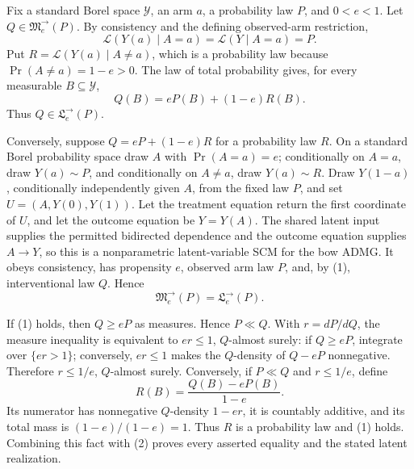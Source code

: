 Fix a standard Borel space \(\mathcal Y\), an arm \(a\), a probability law \(P\), and \(0<e<1\).  Let \(Q\in\mathfrak M^{\to}_e(P)\).  By consistency and the defining observed-arm restriction,
\[
 \mathcal L(Y(a)\mid A=a)=\mathcal L(Y\mid A=a)=P.
\]
Put \(R=\mathcal L(Y(a)\mid A\ne a)\), which is a probability law because \(\Pr(A\ne a)=1-e>0\).  The law of total probability gives, for every measurable \(B\subseteq\mathcal Y\),
\[
 Q(B)=eP(B)+(1-e)R(B). \tag{1}
\]
Thus \(Q\in\mathfrak L^{\to}_e(P)\).

Conversely, suppose \(Q=eP+(1-e)R\) for a probability law \(R\).  On a standard Borel probability space draw \(A\) with \(\Pr(A=a)=e\); conditionally on \(A=a\), draw \(Y(a)\sim P\), and conditionally on \(A\ne a\), draw \(Y(a)\sim R\).  Draw \(Y(1-a)\), conditionally independently given \(A\), from the fixed law \(P\), and set \(U=(A,Y(0),Y(1))\).  Let the treatment equation return the first coordinate of \(U\), and let the outcome equation be \(Y=Y(A)\).  The shared latent input supplies the permitted bidirected dependence and the outcome equation supplies \(A\to Y\), so this is a nonparametric latent-variable SCM for the bow ADMG.  It obeys consistency, has propensity \(e\), observed arm law \(P\), and, by (1), interventional law \(Q\).  Hence
\[
 \mathfrak M^{\to}_e(P)=\mathfrak L^{\to}_e(P). \tag{2}
\]

If (1) holds, then \(Q\ge eP\) as measures.  Hence \(P\ll Q\).  With \(r=dP/dQ\), the measure inequality is equivalent to \(er\le1\), \(Q\)-almost surely: if \(Q\ge eP\), integrate over \(\{er>1\}\); conversely, \(er\le1\) makes the \(Q\)-density of \(Q-eP\) nonnegative.  Therefore \(r\le1/e\), \(Q\)-almost surely.  Conversely, if \(P\ll Q\) and \(r\le1/e\), define
\[
 R(B)=\frac{Q(B)-eP(B)}{1-e}.
\]
Its numerator has nonnegative \(Q\)-density \(1-er\), it is countably additive, and its total mass is \((1-e)/(1-e)=1\).  Thus \(R\) is a probability law and (1) holds.  Combining this fact with (2) proves every asserted equality and the stated latent realization.